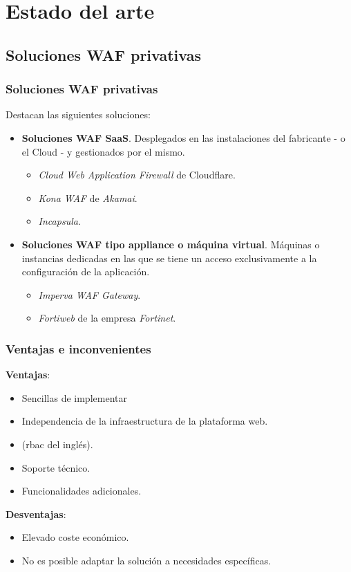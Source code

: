 \section{Estado del arte}

\subsection{Soluciones WAF privativas}
\begin{frame}[shrink]
  \frametitle{Soluciones WAF privativas}
  Destacan las siguientes soluciones:
  \begin{itemize}
    \item {\bf Soluciones WAF SaaS}. Desplegados en las instalaciones del fabricante - o el Cloud - y gestionados por el mismo.
      \begin{itemize}
        \item {\em Cloud Web Application Firewall} \cite{cloudflarewaf} de Cloudflare\cite{cloudflare}.
        \item {\em Kona WAF\cite{kona}} de {\em Akamai\cite{akamai}}.
        \item {\em Incapsula\cite{Incapsula}}.
      \end{itemize}
    \item {\bf Soluciones WAF tipo appliance o máquina virtual}. Máquinas o instancias dedicadas en las que se tiene un acceso exclusivamente a la configuración de la aplicación.
      \begin{itemize}
        \item {\em Imperva WAF Gateway\cite{imperva}}.
        \item {\em Fortiweb\cite{fortiweb}} de la empresa {\em Fortinet\cite{fortinet}}.
      \end{itemize}
  \end{itemize}
\end{frame}

\begin{frame}[shrink]
  \frametitle{Ventajas e inconvenientes}
  {\bf Ventajas}:
  \begin{itemize}
    \item Sencillas de implementar
    \item Independencia de la infraestructura de la plataforma web.
    \item (\acrshort{rbac} del inglés).
    \item Soporte técnico.
    \item Funcionalidades adicionales.
  \end{itemize}
  {\bf Desventajas}:
  \begin{itemize}
    \item Elevado coste económico.
    \item No es posible adaptar la solución a necesidades específicas.
  \end{itemize}
\end{frame}

